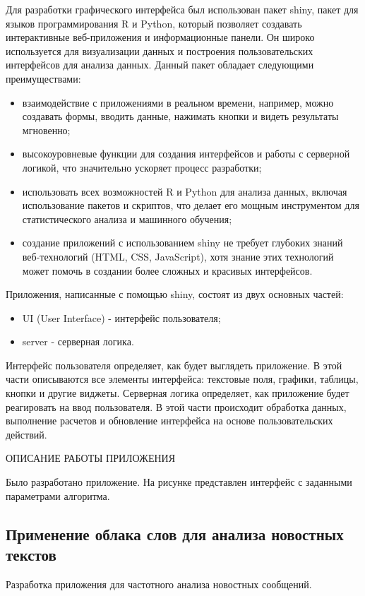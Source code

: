 \documentclass[bachelor, och, coursework ]{SCWorks}
\begin{document}
Для разработки графического интерфейса был использован пакет shiny, пакет для языков программирования R и Python, который позволяет создавать интерактивные веб-приложения и информационные панели. Он широко используется для визуализации данных и построения пользовательских интерфейсов для анализа данных. Данный пакет обладает следующими преимуществами:
\begin{itemize}
    \item взаимодействие с приложениями в реальном времени, например, можно создавать формы, вводить данные, нажимать кнопки и видеть результаты мгновенно;
    \item высокоуровневые функции для создания интерфейсов и работы с серверной логикой, что значительно ускоряет процесс разработки;
    \item использовать всех возможностей R и Python для анализа данных, включая использование пакетов и скриптов, что делает его мощным инструментом для статистического анализа и машинного обучения;
    \item создание приложений с использованием shiny не требует глубоких знаний веб-технологий (HTML, CSS, JavaScript), хотя знание этих технологий может помочь в создании более сложных и красивых интерфейсов.
\end{itemize}

Приложения, написанные с помощью shiny, состоят из двух основных частей:
\begin{itemize}
    \item UI (User Interface) - интерфейс пользователя;
    \item server - серверная логика.
\end{itemize}

Интерфейс пользователя определяет, как будет выглядеть приложение. В этой части описываются все элементы интерфейса: текстовые поля, графики, таблицы, кнопки и другие виджеты.
Серверная логика определяет, как приложение будет реагировать на ввод пользователя. В этой части происходит обработка данных, выполнение расчетов и обновление интерфейса на основе пользовательских действий.

ОПИСАНИЕ РАБОТЫ ПРИЛОЖЕНИЯ



Было разработано приложение. На рисунке представлен интерфейс с заданными параметрами алгоритма. 

\subsection{Применение облака слов для анализа новостных текстов}
 Разработка приложения для частотного анализа новостных сообщений.
\end{document}
